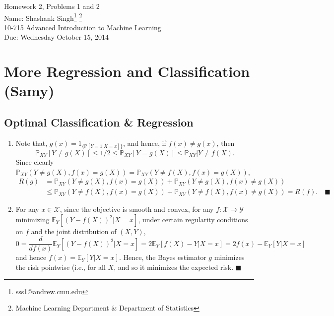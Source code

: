 \documentclass[11pt]{article}
\makeatletter
\newcommand{\myname}{Shashank Singh\footnote{sss1@andrew.cmu.edu}
        \footnote{Machine Learning Department \& Department of Statistics}}
\newcommand{\myclass}{10-715 Advanced Introduction to Machine Learning}
\newcommand{\myhwnum}{2}
\newcommand{\duedate}{Wednesday October 15, 2014}
\renewcommand{\qed}{\quad \ensuremath{\blacksquare}}
\newcommand{\E}{\mathbb{E}} %
\newcommand{\X}{\mathcal{X}}
\newcommand{\Y}{\mathcal{Y}}
\renewcommand{\P}{\mathbb{P}}   %
\makeatother
\begin{document}
\thispagestyle{plain}

{\Large Homework \myhwnum, Problems 1 and 2} \\
Name: \myname \\
\myclass \\
Due: \duedate

\section{More Regression and Classification (Samy)}
\subsection{Optimal Classification \& Regression}
\begin{enumerate}
\item Note that, $g(x) = 1_{\{\P[Y = 1 | X = x]\}}$, and hence, if
$f(x) \neq g(x)$, then
\[\P_{XY}[Y \neq g(X)]
    \leq 1/2
    \leq \P_{XY}[Y = g(X)]
    \leq \P_{XY}[Y \neq f(X).\]
Since clearly
$\P_{XY}(Y \neq g(X), f(x) = g(X)) = \P_{XY}(Y \neq f(X), f(x) = g(X))$,
\begin{align*}
R(g)
 &  = \P_{XY}(Y \neq g(X), f(x) = g(X))
    + \P_{XY}(Y \neq g(X), f(x) \neq g(X))  \\
 &  \leq \P_{XY}(Y \neq f(X), f(x) = g(X))
    + \P_{XY}(Y \neq f(X), f(x) \neq g(X))
    = R(f). \qed
\end{align*}
\item For any $x \in \X$, since the objective is smooth and convex, for any
$f : \X \to \Y$ minimizing $\E_Y[(Y - f(X))^2 | X = x]$, under certain
regularity conditions on $f$ and the joint distribution of $(X,Y)$,
\[0
    = \frac{d}{df(x)} \E_Y[(Y - f(X))^2 | X = x]
    = 2 \E_Y[f(X) - Y | X = x]
    = 2 f(x) - \E_Y[Y | X = x]
\]
and hence $f(x) = \E_Y[Y | X = x]$. Hence, the Bayes estimator $g$ minimizes
the risk pointwise (i.e., for all $X$, and so it minimizes the expected risk.
\qed
\end{enumerate}
\end{document}
